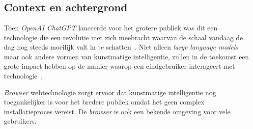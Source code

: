 
\chapter{}
\label{ch:inleiding}



\section{Context en achtergrond} %
Toen \textit{OpenAI ChatGPT} lanceerde voor het grotere publiek was dit een technologie die een revolutie met zich meebracht waarvan de schaal vandaag de dag nog steeds moeilijk valt in te schatten~\autocite{Marr2023}. Niet alleen \textit{large language models} maar ook andere vormen van kunstmatige intelligentie, zullen in de toekomst een grote impact hebben op de manier waarop een eindgebruiker interageert met technologie~\autocite{Shumylo2023a}.

\bigbreak{}

\textit{Browser} webtechnologie zorgt ervoor dat kunstmatige intelligentie nog toegankelijker is voor het bredere publiek omdat het geen complex in\-sta\-lla\-tie\-pro\-ces vereist. De \textit{browser} is ook een bekende omgeving voor vele gebruikers.

